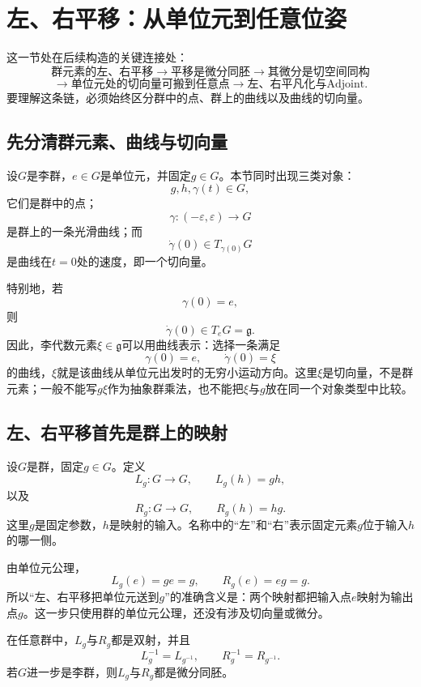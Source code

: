 
\section{左、右平移：从单位元到任意位姿}

这一节处在后续构造的关键连接处：
\[
    \text{群元素的左、右平移}
    \longrightarrow
    \text{平移是微分同胚}
    \longrightarrow
    \text{其微分是切空间同构}
\]
\[
    \longrightarrow
    \text{单位元处的切向量可搬到任意点}
    \longrightarrow
    \text{左、右平凡化与Adjoint}.
\]
要理解这条链，必须始终区分群中的点、群上的曲线以及曲线的切向量。

\subsection{先分清群元素、曲线与切向量}

设$G$是李群，$e\in G$是单位元，并固定$g\in G$。本节同时出现三类对象：
\[
    g,h,\gamma(t)\in G,
\]
它们是群中的点；
\[
    \gamma:(-\varepsilon,\varepsilon)\to G
\]
是群上的一条光滑曲线；而
\[
    \dot\gamma(0)\in T_{\gamma(0)}G
\]
是曲线在$t=0$处的速度，即一个切向量。

特别地，若
\[
    \gamma(0)=e,
\]
则
\[
    \dot\gamma(0)\in T_eG=\mathfrak g.
\]
因此，李代数元素$\xi\in\mathfrak g$可以用曲线表示：选择一条满足
\[
    \gamma(0)=e,
    \qquad
    \dot\gamma(0)=\xi
\]
的曲线，$\xi$就是该曲线从单位元出发时的无穷小运动方向。这里$\xi$是切向量，不是群元素；一般不能写$g\xi$作为抽象群乘法，也不能把$\xi$与$g$放在同一个对象类型中比较。

\subsection{左、右平移首先是群上的映射}

\begin{definition}[左平移与右平移]
设$G$是群，固定$g\in G$。定义
\[
    L_g:G\to G,
    \qquad
    L_g(h)=gh,
\]
以及
\[
    R_g:G\to G,
    \qquad
    R_g(h)=hg.
\]
这里$g$是固定参数，$h$是映射的输入。名称中的“左”和“右”表示固定元素$g$位于输入$h$的哪一侧。
\end{definition}

由单位元公理，
\[
    L_g(e)=ge=g,
    \qquad
    R_g(e)=eg=g.
\]
所以“左、右平移把单位元送到$g$”的准确含义是：两个映射都把输入点$e$映射为输出点$g$。这一步只使用群的单位元公理，还没有涉及切向量或微分。

\begin{proposition}[左、右平移的双射与微分同胚性]
在任意群中，$L_g$与$R_g$都是双射，并且
\[
    L_g^{-1}=L_{g^{-1}},
    \qquad
    R_g^{-1}=R_{g^{-1}}.
\]
若$G$进一步是李群，则$L_g$与$R_g$都是微分同胚。
\end{proposition}

